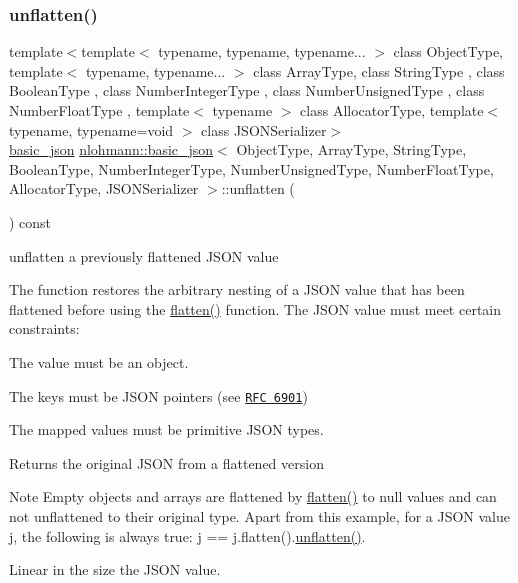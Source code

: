 \subsubsection{\texorpdfstring{unflatten()}{unflatten()}}
{\footnotesize\ttfamily template$<$template$<$ typename, typename, typename... $>$ class Object\+Type, template$<$ typename, typename... $>$ class Array\+Type, class String\+Type , class Boolean\+Type , class Number\+Integer\+Type , class Number\+Unsigned\+Type , class Number\+Float\+Type , template$<$ typename $>$ class Allocator\+Type, template$<$ typename, typename=void $>$ class J\+S\+O\+N\+Serializer$>$ \\
\hyperlink{classnlohmann_1_1basic__json}{basic\+\_\+json} \hyperlink{classnlohmann_1_1basic__json}{nlohmann\+::basic\+\_\+json}$<$ Object\+Type, Array\+Type, String\+Type, Boolean\+Type, Number\+Integer\+Type, Number\+Unsigned\+Type, Number\+Float\+Type, Allocator\+Type, J\+S\+O\+N\+Serializer $>$\+::unflatten (\begin{DoxyParamCaption}{ }\end{DoxyParamCaption}) const\hspace{0.3cm}{\ttfamily [inline]}}



unflatten a previously flattened J\+S\+ON value 

The function restores the arbitrary nesting of a J\+S\+ON value that has been flattened before using the \hyperlink{classnlohmann_1_1basic__json_ab838f000d76662917ffd6ec529569e03}{flatten()} function. The J\+S\+ON value must meet certain constraints\+:
\begin{DoxyEnumerate}
\item The value must be an object.
\item The keys must be J\+S\+ON pointers (see \href{https://tools.ietf.org/html/rfc6901}{\tt R\+FC 6901})
\item The mapped values must be primitive J\+S\+ON types.
\end{DoxyEnumerate}

\begin{DoxyReturn}{Returns}
the original J\+S\+ON from a flattened version
\end{DoxyReturn}
\begin{DoxyNote}{Note}
Empty objects and arrays are flattened by \hyperlink{classnlohmann_1_1basic__json_ab838f000d76662917ffd6ec529569e03}{flatten()} to {\ttfamily null} values and can not unflattened to their original type. Apart from this example, for a J\+S\+ON value {\ttfamily j}, the following is always true\+: {\ttfamily j == j.\+flatten().\hyperlink{classnlohmann_1_1basic__json_a74fa3ab2003f2f6f2b69deaafed9126d}{unflatten()}}.
\end{DoxyNote}
Linear in the size the J\+S\+ON value.


